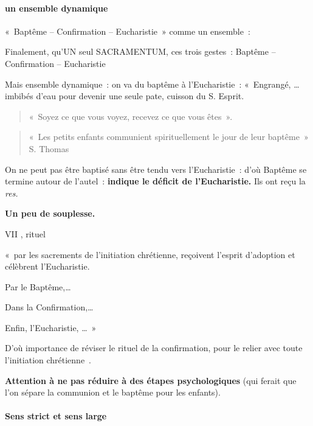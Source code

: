 \hypertarget{un-ensemble-dynamique}{%
\paragraph{un ensemble dynamique}\label{un-ensemble-dynamique}}

«~Baptême -- Confirmation -- Eucharistie~» comme un ensemble~:

Finalement, qu'UN seul SACRAMENTUM, ces trois gestes~: Baptême --
Confirmation -- Eucharistie~

Mais ensemble dynamique~: on va du baptême à l'Eucharistie~: «~Engrangé,
\ldots{} imbibés d'eau pour devenir une seule pate, cuisson du S.
Esprit.\\

 \begin{quote}
      «~Soyez ce que vous voyez, recevez ce que vous êtes~».   
 \end{quote}
 
 

\begin{quote}
    «~Les petits enfants communient spirituellement le jour de leur
baptême~» S. Thomas
\end{quote}


On ne peut pas être baptisé sans être tendu vers l'Eucharistie~: d'où
Baptême se termine autour de l'autel~: \textbf{indique le déficit de
l'Eucharistie.} Ils ont reçu la \emph{res.}

\textbf{Un peu de souplesse.}

VII , rituel

«~par les sacrements de l'initiation chrétienne, reçoivent l'esprit
d'adoption et célèbrent l'Eucharistie.

Par le Baptême,\ldots{}

Dans la Confirmation,\ldots{}

Enfin, l'Eucharistie, \ldots~»

D'où importance de réviser le rituel de la confirmation, pour le relier
avec toute l'initiation chrétienne~.

\textbf{Attention à ne pas réduire à des étapes psychologiques} (qui
ferait que l'on sépare la communion et le baptême pour les enfants).

\hypertarget{sens-strict-et-sens-large}{%
\paragraph{Sens strict et sens
large}\label{sens-strict-et-sens-large}}

